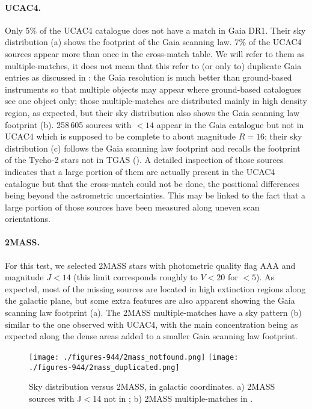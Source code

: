 \paragraph{UCAC4.} Only 5\% of the UCAC4 catalogue does not have a match in Gaia DR1. Their sky distribution (a) shows the footprint of the Gaia scanning law. 
7\% of the UCAC4 sources appear more than once in the cross-match table. 
We will refer to them as multiple-matches, it does not mean that this refer to (or only to) duplicate Gaia entries as discussed in : the Gaia resolution is much better than ground-based instruments so that multiple objects may appear where ground-based catalogues see one object only; those multiple-matches are distributed mainly in high density region, as expected, but their sky distribution also shows the Gaia scanning law footprint (b). 
258\,605 sources with \gmag$<14$ appear in the Gaia catalogue but not in UCAC4 which is supposed to be complete to about magnitude $R=16$; their sky distribution (c) follows the Gaia scanning law footprint and recalls the footprint of the Tycho-2 stars not in TGAS (). A detailed inspection of those sources indicates that a large portion of them are actually present in the UCAC4 catalogue but that the cross-match could not be done, the positional differences being beyond the astrometric uncertainties. This may be linked to the fact that a large portion of those sources have been measured along uneven scan orientations. %

\paragraph{2MASS.} For this test, we selected 2MASS stars with photometric quality flag AAA and magnitude $J<14$ (this limit corresponds roughly to $V<20$ for \av$<5$). As expected, most of the missing sources are located in high extinction regions along the galactic plane, but some extra features are also apparent showing the Gaia scanning law footprint (a).
The 2MASS multiple-matches have a sky pattern (b) similar to the one observed with UCAC4, with the main concentration being as expected along the dense areas added to a smaller Gaia scanning law footprint. 

\begin{figure}
    \begin{center}
        \texttt{[image: ./figures-944/2mass\_notfound.png]}
        \texttt{[image: ./figures-944/2mass\_duplicated.png]}\\
        \caption[Sky distribution versus 2MASS]{Sky distribution versus 2MASS, in galactic coordinates. a) 2MASS sources with J$<$14 not in {}; b) 2MASS multiple-matches in {}.}
        \label{fig:wp944_2mass} 
    \end{center}
\end{figure}


